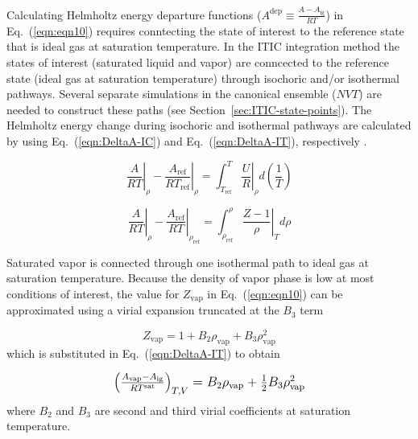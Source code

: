 \documentclass[5p,times]{elsarticle}
\begin{document}
Calculating Helmholtz energy departure functions ($A^\mathrm{dep} \equiv \frac{A-A_\mathrm{ig}}{RT}$) in Eq.~(\ref{eqn:eqn10}) requires conntecting the state of interest to the reference state that is ideal gas at saturation temperature. In the ITIC integration method the states of interest (saturated liquid and vapor) are conncected to the reference state (ideal gas at saturation temperature) through isochoric and/or isothermal pathways. Several separate simulations in the canonical ensemble ($NVT$) are needed to construct these paths (see Section~\ref{sec:ITIC-state-points}). The Helmholtz energy change during isochoric and isothermal pathways are calculated by using Eq.~(\ref{eqn:DeltaA-IC}) and Eq.~(\ref{eqn:DeltaA-IT}), respectively \cite{Elliott1999}.

\begin{equation}
\left. \frac{A}{RT} \right\vert_{\rho}  -  \left. \frac{A_\mathrm{ref}}{RT_\mathrm{ref}} \right\vert_{\rho} = \int _{T_\mathrm{ref}}^{T} \left.\frac{U}{R} \right\vert_{\rho} d\left(\frac{1}{T}\right)
\label{eqn:DeltaA-IC}
\end{equation}


\begin{equation}
\left.\frac{A}{RT}\right\vert_\rho-\left.\frac{A_\mathrm{ref}}{RT}\right\vert_{\rho_\mathrm{ref}} = \int _{\rho_\mathrm{ref}}^{\rho}\left.\frac{Z-1}{\rho}\right\vert_T d\rho
\label{eqn:DeltaA-IT}
\end{equation}

Saturated vapor is connected through one isothermal path to ideal gas at saturation temperature. Because the density of vapor phase is low at most conditions of interest, the value for $Z_{\mathrm{vap}}$ in Eq.~(\ref{eqn:eqn10}) can be approximated using a virial expansion truncated at the $B_3$ term

\begin{equation}
{Z_{\mathrm{vap}}} = 1 + {B_2}{\rho_{\mathrm{vap}}} + {B_3}\rho_{\mathrm{vap}}^2
\label{eqn:eqn11}
\end{equation}
which is substituted in Eq.~(\ref{eqn:DeltaA-IT}) to obtain

\begin{equation}
\begingroup
\large
\begin{array}{l}{\left( {\frac{{{A_\mathrm{vap}} - {A_\mathrm{ig}}}}{{RT^\mathrm{sat}}}} \right)_{T,V}} =  {B_2}{\rho _{\mathrm{vap}}} + \frac{1}{2}{B_3}\rho _{\mathrm{vap}}^2
\\ 
\end{array} 
\endgroup
\label{eqn:eqn12}
\end{equation}
where $B_2$ and $B_3$ are second and third virial coefficients at saturation temperature.
\end{document}
